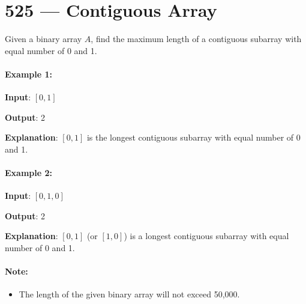 \section{525 --- Contiguous Array}
Given a binary array $A$, find the maximum length of a contiguous subarray with equal number of 0 and 1.

\paragraph{Example 1:}

\begin{flushleft}
\textbf{Input}: $ [0,1] $

\textbf{Output}: 2

\textbf{Explanation}: $ [0, 1] $ is the longest contiguous subarray with equal number of 0 and 1.
\end{flushleft}

\paragraph{Example 2:}

\begin{flushleft}
\textbf{Input}: $ [0,1,0] $

\textbf{Output}: 2

\textbf{Explanation}: $ [0, 1] $ (or $ [1, 0] $) is a longest contiguous subarray with equal number of 0 and 1.
\end{flushleft}

\paragraph{Note:} 

\begin{itemize}
\item The length of the given binary array will not exceed 50,000. 
\end{itemize}